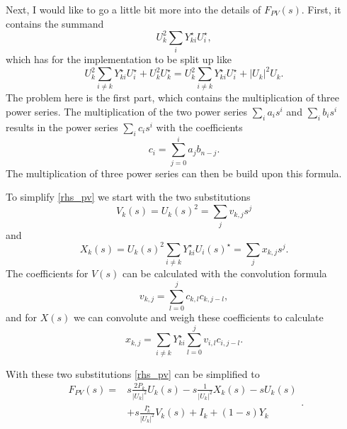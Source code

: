 Next, I would like to go a little bit more into the details of $F_{PV}(s)$. First, it contains the summand 
\begin{equation}
	U_k^2 \sum_i Y_{ki}^\star U_i^\star,
\end{equation}
which has for the implementation to be split up like
\begin{equation}
	U_k^2 \sum_{i \ne k} Y_{ki}^\star U_i^\star + U_k^2 U_k^\star = U_k^2 \sum_{i \ne k} Y_{ki}^\star U_i^\star + |U_k|^2 U_k.
\end{equation}
The problem here is the first part, which contains the multiplication of three power series. The multiplication of the two power series $\sum_i a_i s^i$ and $\sum_i b_i s^i$ results in the power series $\sum_i c_i s^i$ with the coefficients
\begin{equation}
	c_i = \sum_{j = 0}^i a_j b_{n - j}.
\end{equation}
The multiplication of three power series can then be build upon this formula.

To simplify \eqref{rhs_pv} we start with the two substitutions
\begin{equation}
	V_k(s) = U_k(s)^2 = \sum_j v_{k,j} s^j
\end{equation}
and
\begin{equation}
	X_k(s) = U_k(s)^2 \sum_{i \ne k} Y_{ki}^\star U_i(s)^\star = \sum_j x_{k,j} s^j.
\end{equation}
The coefficients for $V(s)$ can be calculated with the convolution formula
\begin{equation}
	v_{k,j} = \sum_{l = 0}^j c_{k,l} c_{k,j - l},
\end{equation}
and for $X(s)$ we can convolute and weigh these coefficients to calculate
\begin{equation}
	x_{k,j} = \sum_{i \ne k} Y_{ki}^\star \sum_{l = 0}^j v_{i,l} c_{i,j - l}.
\end{equation}

With these two substitutions \eqref{rhs_pv} can be simplified to
\begin{equation}
	\begin{split}
		F_{PV}(s) = 
			& s \frac{2 P_k}{|U_k|^2} U_k(s) - s \frac{1}{|U_k|^2} X_k(s) - s U_k(s) \\
			& + s \frac{I_k^\star}{|U_k|^2} V_k(s) + I_k + (1 - s) Y_k
	\end{split}.
\end{equation}

